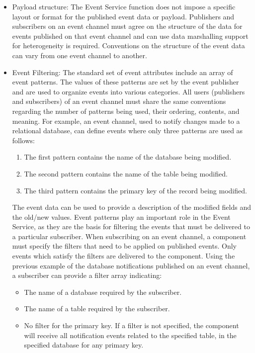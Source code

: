 \begin{flushleft}
\begin{itemize}
\item
Payload structure: The Event Service function does not impose a specific layout or format for the published event data or payload. Publishers and subscribers on an
event channel must agree on the structure of the data for events published on that event channel and can use data marshalling support for heterogeneity is
required. Conventions on the structure of the event data can vary from one event channel to another. 
\item
Event Filtering: The standard set of event attributes include an array of event patterns. The values of these patterns are set by the event publisher and
are used to organize events into various categories. All users (publishers and subscribers) of an event channel must share the same conventions regarding
the number of patterns being used, their ordering, contents, and meaning. 
For example, an event channel, used to notify changes made to a relational database, can define events where only three patterns are used as follows: 
\begin{enumerate}
\item
The first pattern contains the name of the database being modified. 
\item
The second pattern contains the name of the table being modified. 
\item
The third pattern contains the primary key of the record being modified.
\end{enumerate}
The event data can be used to provide a description of the modified fields and the old/new values. Event patterns play an important role in the Event 
Service, as they are the basis for filtering the events that must be delivered to a particular subscriber. When subscribing on an event channel, a 
component must specify the filters that need to be applied on published events. Only events which satisfy the filters are delivered to 
the component. 
Using the previous example of the database notifications published on an event channel, a subscriber can provide a filter array indicating: 
\begin{itemize}
\item
The name of a database required by the subscriber. 
\item
The name of a table required by the subscriber. 
\item
No filter for the primary key. If a filter is not specified, the component will receive all notification events related to the 
specified table, in the specified database for any primary key. 
\end{itemize}


\end{itemize}
\end{flushleft}
